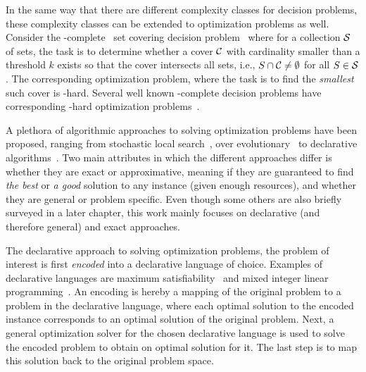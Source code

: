 In the same way that there are different complexity classes for decision problems, these complexity classes can be extended to optimization problems as well.
Consider the \NP-complete~\autocite{} set covering decision problem~\autocite{DBLP:conf/coco/Karp72} where for a collection $\mathcal{S}$ of sets, the task is to determine whether a cover $\mathcal{C}$ with cardinality smaller than a threshold $k$ exists so that the cover intersects all sets, i.e., $S \cap \mathcal{C} \neq \emptyset$ for all $S\in\mathcal{S}$.
The corresponding optimization problem, where the task is to find the \emph{smallest} such cover is \NP-hard.
Several well known \NP-complete decision problems have corresponding \NP-hard optimization problems~\autocite{KorteVygen2018-15}.

A plethora of algorithmic approaches to solving optimization problems have been proposed, ranging from stochastic local search~\autocite{}, over evolutionary~\autocite{Dasgupta2013,DBLP:journals/jgo/StornP97} to declarative algorithms~\autocite{}.
Two main attributes in which the different approaches differ is whether they are exact or approximative, meaning if they are guaranteed to find \emph{the best} or \emph{a good} solution to any instance (given enough resources), and whether they are general or problem specific.
Even though some others are also briefly surveyed in a later chapter, this work mainly focuses on declarative (and therefore general) and exact approaches.

The declarative approach to solving optimization problems, the problem of interest is first \emph{encoded} into a declarative language of choice.
Examples of declarative languages are maximum satisfiability~\autocite{handbook2-maxsat} and mixed integer linear programming~\autocite{ChenEtAl2010AppliedIntegerProgramming,KorteVygen2018-5}.
An encoding is hereby a mapping of the original problem to a problem in the declarative language, where each optimal solution to the encoded instance corresponds to an optimal solution of the original problem.
Next, a general optimization solver  for the chosen declarative language is used to solve the encoded problem to obtain on optimal solution for it.
The last step is to map this solution back to the original problem space.

